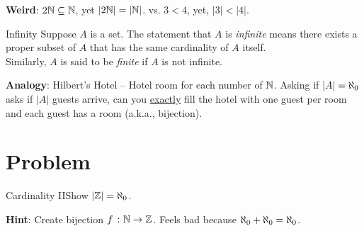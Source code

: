         \textbf{Weird}: \(2\mathbb{N} \subseteq \mathbb{N}\), yet \(|2\mathbb{N}| = |\mathbb{N}|\). vs. \( 3< 4\), yet, \(|3| < |4|\). \\

            \begin{definition}
                {Infinity} Suppose \(A\) is a set. The statement that \(A\) is \textit{infinite} means there exists a proper subset of \(A\) that has the same cardinality of \(A\) itself. \\
                Similarly, \(A\) is said to be \textit{finite} if \(A\) is not infinite.
            \end{definition}

        \textbf{Analogy}: Hilbert's Hotel -- Hotel room for each number of \(\mathbb{N}\). Asking if \(|A| = \aleph_0\) asks if \(|A|\) guests arrive, can you \underline{exactly} fill the hotel with one guest per room and each guest has a room (a.k.a., bijection).

        \section{Problem}


            \begin{exercise}
                {Cardinality II}Show \(|\mathbb{Z}| = \aleph_0\).
            \end{exercise}
            \textbf{Hint}: Create bijection \(f \ \colon \mathbb{N} \rightarrow \mathbb{Z}\). Feels bad because \(\aleph_0 + \aleph_0 = \aleph_0\).

